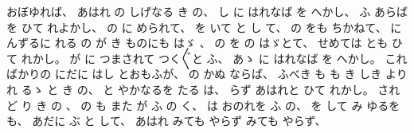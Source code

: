 おぼゆれば、
%
あはれ
の
しげなる
き
の、
%
し
に
はれなば
%
を
へかし、
%
ふ
あらば
を
ひて
れよかし、
%
の
に%
められて、
%
を
いて
と
し
て、
%
の
をも
ちかねて、
%
に
んずるに
れる
の
が
き
ものにも
はゞ%
、
%
%
の
を
の
はゞとて、%
%
せめては
とも
ひて
れかし。
%
が
に
つまされて
つく〴〵と
ふ、
%
あゝ%
に
はれなば
を
へかし。
%
こればかりの
にだに
はし
とおもふが、
%
の
かぬ
ならば、
%
ふべき
も
も
き
しき
より
れ
%
るゝ%
と
き
の、
%
と
やかなるを
たる
は、
%
らず
あはれと
ひて
れかし。
%
されど
り
き
の
、
%
の
も
また
%
が
ふ
の
く、
%
は
おのれを
ふ
の、
%
を
して
み
ゆるをも、
%
あだに
ぶ
と
して、
%
あはれ
みても
やらず
%
みても
やらず、
